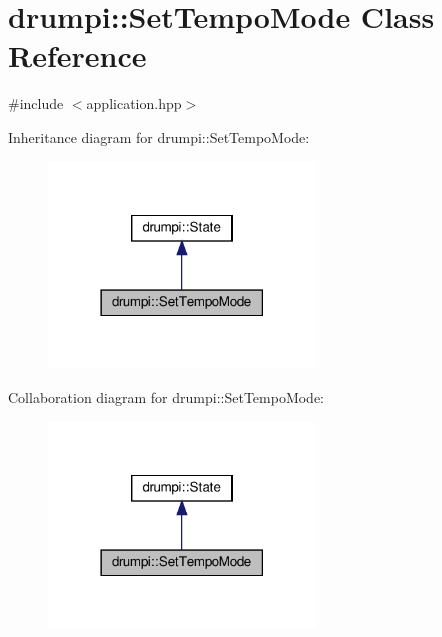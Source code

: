 \hypertarget{classdrumpi_1_1SetTempoMode}{}\section{drumpi\+:\+:Set\+Tempo\+Mode Class Reference}
\label{classdrumpi_1_1SetTempoMode}


{\ttfamily \#include $<$application.\+hpp$>$}



Inheritance diagram for drumpi\+:\+:Set\+Tempo\+Mode\+:
\nopagebreak
\begin{figure}[H]
\begin{center}
\leavevmode
\includegraphics[width=201pt]{classdrumpi_1_1SetTempoMode__inherit__graph}
\end{center}
\end{figure}


Collaboration diagram for drumpi\+:\+:Set\+Tempo\+Mode\+:
\nopagebreak
\begin{figure}[H]
\begin{center}
\leavevmode
\includegraphics[width=201pt]{classdrumpi_1_1SetTempoMode__coll__graph}
\end{center}
\end{figure}
